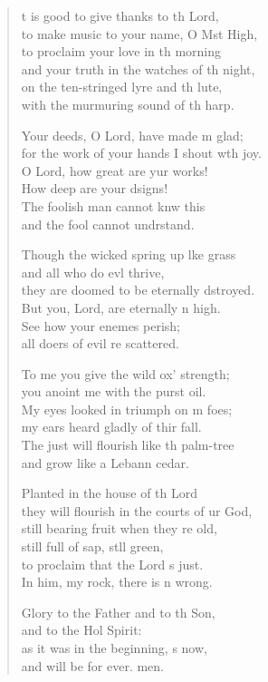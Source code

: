 \begin{verse}
  \begin{patverse}
t is good to give thanks to th Lord,\Med\\
    to make music to your name, O Mst High,\\
to proclaim your love in th morning\Med\\
    and your truth in the watches of th night,\\
on the ten-stringed lyre and th lute,\Med\\
    with the murmuring sound of th harp.

Your deeds, O Lord, have made m glad;\Med\\
    for the work of your hands I shout w\pointup{\i}th joy.\\
O Lord, how great are yur works!\Med\\
    How deep are your dsigns!\\
The foolish man cannot knw this\Med\\
    and the fool cannot undrstand.

Though the wicked spring up l\pointup{\i}ke grass\Med\\
    and all who do ev\pointup{\i}l thrive,\\
they are doomed to be eternally dstroyed.\Med\\
    But you, Lord, are eternally n high.\\
See how your enem\pointup{\i}es perish;\Med\\
    all doers of evil re scattered.

To me you give the wild ox’ strength;\Med\\
    you anoint me with the purst oil.\\
My eyes looked in triumph on m foes;\Med\\
    my ears heard gladly of thir fall.\\
The just will flourish like th palm-tree\Med\\
    and grow like a Lebann cedar.

Planted in the house of th Lord\Med\\
    they will flourish in the courts of ur God,\\
still bearing fruit when they re old,\Med\\
    still full of sap, st\pointup{\i}ll green,\\
to proclaim that the Lord \pointup{\i}s just.\Med\\
    In him, my rock, there is n wrong.

Glory to the Father and to th Son,\Med\\
    and to the Hol Spirit:\\
as it was in the beginning, \pointup{\i}s now,\Med\\
    and will be for ever. men.
  \end{patverse}
  \end{verse}
